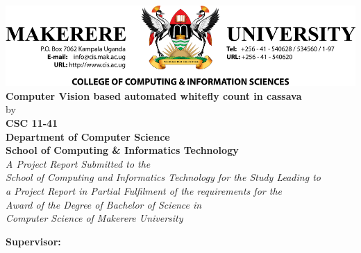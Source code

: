 \begin{titlepage}

\begin{center}

\includegraphics[width=1\textwidth]{img/maklogo}\\%
\vspace{3em}%
\Large \textbf {Computer Vision based automated whitefly count in cassava}\\%
\vspace{1em}%
\normalsize by \\%
\vspace{1em}
\textup{\small {\bf CSC 11-41}\\}
 \vspace{1em}%
{\bf Department of Computer Science \\ School of Computing \& Informatics Technology}\\[0.5in]

\emph{A Project Report Submitted to the \\School of Computing and Informatics Technology
for the Study Leading to\\ a Project Report in Partial Fulfilment of the
requirements for the\\ Award of the Degree of Bachelor of Science in \\Computer Science
of Makerere University}

        \vspace{1in}

       

\normalsize {\bf Supervisor:} \\


\end{center}
\end{titlepage}

